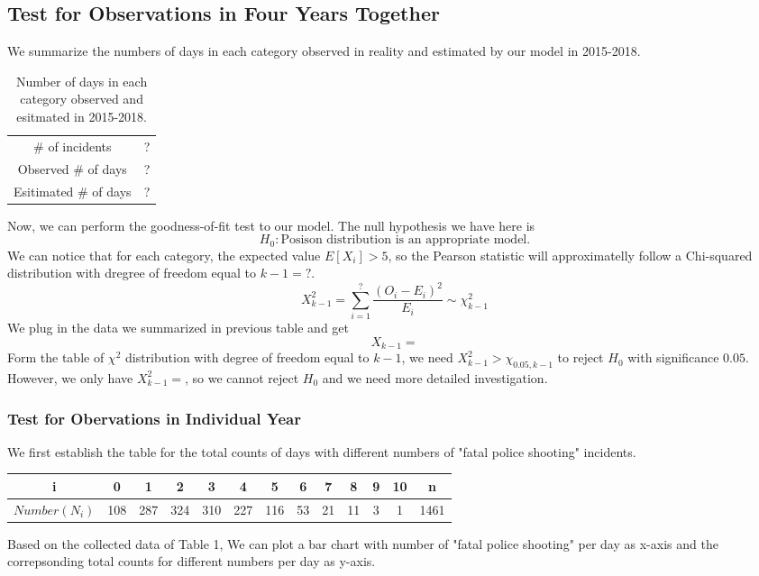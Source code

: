 \documentclass[11pt,a4paper,english]{article}
\begin{document}
\subsection{Test for Observations in Four Years Together}
We summarize the numbers of days in each category observed in reality and estimated by our model in 2015-2018.
\begin{table}[htbp]
    \centering
    \caption{Number of days in each category observed and esitmated in 2015-2018.}
    \begin{tabular}{cc}
        \# of incidents & ?\\
        Observed \# of days & ?\\
        Esitimated \# of days & ?\\
    \end{tabular}
\end{table}

Now, we can perform the goodness-of-fit test to our model. The null hypothesis we have here is 
\[H_{0}:\text{Posison distribution is an appropriate model.}\]
We can notice that for each category, the expected value $E[X_{i}] > 5$, so the Pearson statistic will approximatelly follow a Chi-squared distribution with dregree of freedom equal to $k-1 = ?$.
\[X^{2}_{k-1} = \sum_{i = 1}^{?}
\frac{(O_{i}-E_{i})^{2}}{E_{i}} \sim \chi_{k-1}^{2}\]
We plug in the data we summarized in previous table and get 
\[X_{k-1} = \]
Form the table of $\chi^{2}$ distribution with degree of freedom equal to $k-1$, we need $X^{2}_{k-1} > \chi_{0.05,k-1}$ to reject $H_{0}$ with significance $0.05$. However, we only have $X_{k-1}^{2} = $, so we cannot reject $H_{0}$ and we need more detailed investigation. 

\subsubsection{Test for Obervations in Individual Year}
We first establish the table for the total counts of days with different numbers of "fatal police shooting" incidents.
\begin{table}[!htbp]
\centering
\begin{tabular}{|cccccccccccc||c|}
\hline
i&0&1&2&3&4&5&6&7&8&9&10&n\\
\hline
$Number(N_{i})$&108&287&324&310&227&116&53&21&11&3&1&1461\\
\hline
\end{tabular}
\end{table}

Based on the collected data of Table 1, We can plot a bar chart with number of "fatal police shooting" per day as x-axis and the correpsonding total counts for different numbers per day as y-axis.
\end{document}

